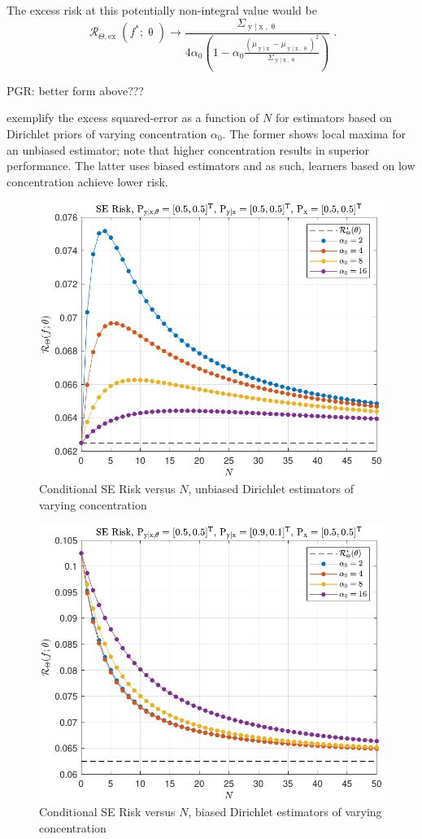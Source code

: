 \documentclass[12pt]{report}
\DeclareMathOperator{\xrm}{\mathrm{x}}
\DeclareMathOperator{\yrm}{\mathrm{y}}
\DeclareMathOperator{\Rcal}{\mathcal{R}}
\begin{document}
The excess risk at this potentially non-integral value would be 
\begin{equation}
\Rcal_{\Theta, \mathrm{ex}}(f^* ; \uptheta) \to \frac{\Sigma_{\yrm | \xrm,\uptheta}}{4 \alpha_0 \left( 1 - \alpha_0 \frac{\left( \mu_{\yrm | \xrm} - \mu_{\yrm | \xrm,\uptheta} \right)^2}{\Sigma_{\yrm | \xrm,\uptheta}} \right)} \;.
\end{equation}

PGR: better form above???


 exemplify the excess squared-error as a function of $N$ for estimators based on Dirichlet priors of varying concentration $\alpha_0$. The former shows local maxima for an unbiased estimator; note that higher concentration results in superior performance. The latter uses biased estimators and as such, learners based on low concentration achieve lower risk.
\begin{figure}
\centering
\includegraphics[width=0.7\linewidth]{Risk_cond_SE_Dir_N_leg_a0_unbiased.pdf}
\caption{Conditional SE Risk versus $N$, unbiased Dirichlet estimators of varying concentration}
\label{fig:Risk_cond_SE_Dir_N_leg_a0_unbiased}
\end{figure}
\begin{figure}
\centering
\includegraphics[width=0.7\linewidth]{Risk_cond_SE_Dir_N_leg_a0_biased.pdf}
\caption{Conditional SE Risk versus $N$, biased Dirichlet estimators of varying concentration}
\label{fig:Risk_cond_SE_Dir_N_leg_a0_biased}
\end{figure}
\end{document}

